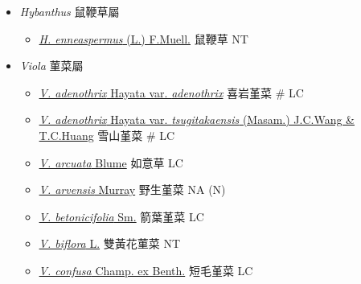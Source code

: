
  \begin{itemize}
 \item[] \textit{Hybanthus} 鼠鞭草屬
                                
  \begin{itemize}
        \item[] \href{http://www.theplantlist.org/tpl1.1/search?q=Hybanthus+enneaspermus}{\textit{H. enneaspermus} (L.) F.Muell.}   鼠鞭草   NT
  \end{itemize}
 \item[] \textit{Viola} 菫菜屬
                                
  \begin{itemize}
        \item[] \href{http://www.theplantlist.org/tpl1.1/search?q=Viola+adenothrix+var.+adenothrix}{\textit{V. adenothrix} Hayata var. \textit{adenothrix}}   喜岩堇菜  \# LC
        \item[] \href{http://www.theplantlist.org/tpl1.1/search?q=Viola+adenothrix+var.+tsugitakaensis}{\textit{V. adenothrix} Hayata var. \textit{tsugitakaensis} (Masam.) J.C.Wang \& T.C.Huang}   雪山堇菜  \# LC
        \item[] \href{http://www.theplantlist.org/tpl1.1/search?q=Viola+arcuata}{\textit{V. arcuata} Blume}   如意草   LC
        \item[] \href{http://www.theplantlist.org/tpl1.1/search?q=Viola+arvensis}{\textit{V. arvensis} Murray}   野生堇菜   NA (N)
        \item[] \href{http://www.theplantlist.org/tpl1.1/search?q=Viola+betonicifolia}{\textit{V. betonicifolia} Sm.}   箭葉堇菜   LC
        \item[] \href{http://www.theplantlist.org/tpl1.1/search?q=Viola+biflora}{\textit{V. biflora} L.}   雙黃花菫菜   NT
        \item[] \href{http://www.theplantlist.org/tpl1.1/search?q=Viola+confusa}{\textit{V. confusa} Champ. ex Benth.}   短毛堇菜   LC

\end{itemize}
\end{itemize}
